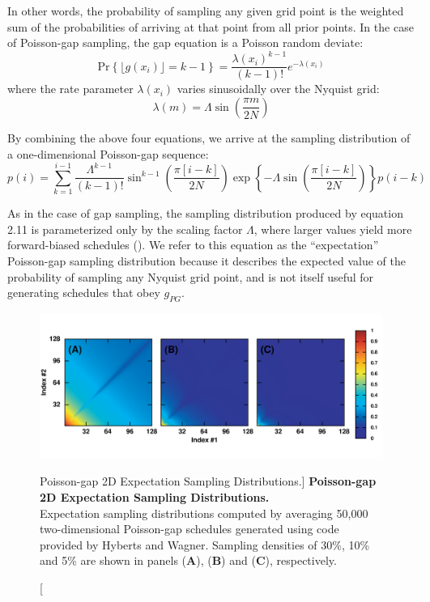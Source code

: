 \begin{doublespace}
In other words, the probability of sampling any given grid point is the
weighted sum of the probabilities of arriving at that point from all prior
points. In the case of Poisson-gap sampling, the gap equation is a Poisson
random deviate:
\begin{equation}
\mathrm{Pr}\left\{ \lfloor g(x_i) \rfloor = k - 1 \right\} =
 \frac{\lambda(x_i)^{k-1}}{(k-1)!} e^{-\lambda(x_i)}
\end{equation}
where the rate parameter $\lambda(x_i)$ varies sinusoidally over the Nyquist
grid:
\begin{equation}
\lambda(m) = \Lambda \sin \left( \frac{\pi m}{2 N} \right)
\end{equation}

By combining the above four equations, we arrive at the sampling distribution
of a one-dimensional Poisson-gap sequence:
\begin{equation}
p(i) = \sum_{k=1}^{i-1} \frac{\Lambda^{k-1}}{(k-1)!}
 \sin^{k-1} \left( \frac{\pi [i-k]}{2 N} \right)
 \exp\left\{
  -\Lambda \sin \left( \frac{\pi [i-k]}{2 N} \right)
 \right\}
p(i-k)
\end{equation}

As in the case of gap sampling, the sampling distribution produced by equation
2.11 is parameterized only by the scaling factor $\Lambda$, where larger values
yield more forward-biased schedules (). We refer
to this equation as the ``expectation'' Poisson-gap sampling distribution
because it describes the expected value of the probability of sampling any
Nyquist grid point, and is not itself useful for generating schedules that
obey $g_{PG}$.
\end{doublespace}

\begin{figure}[ht!]
\includegraphics[width=6in]{figs/dgs/04-expect-hyb.png}
\caption
      [Poisson-gap 2D Expectation Sampling Distributions.]{
  {\bf Poisson-gap 2D Expectation Sampling Distributions.}
  \\
  Expectation sampling distributions computed by averaging 50,000
  two-dimensional Poisson-gap schedules generated using code provided by
  Hyberts and Wagner. Sampling densities of 30\%, 10\% and 5\% are
  shown in panels ({\bf A}), ({\bf B}) and ({\bf C}), respectively.
}
\label{figure.2.4}
\end{figure}

